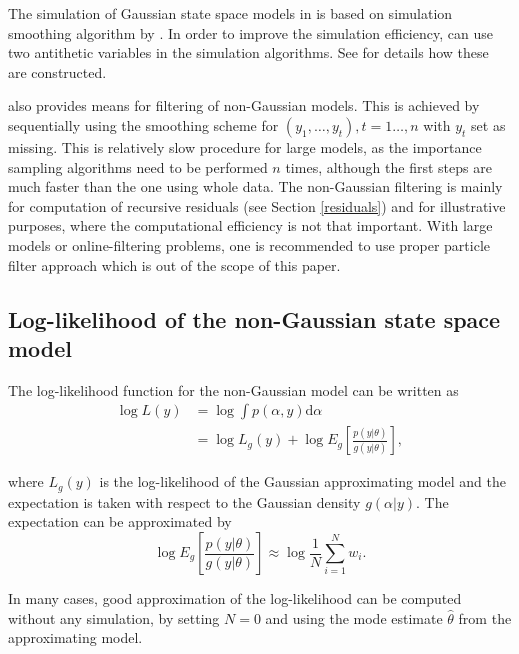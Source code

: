 \documentclass[nojss,article]{jss}\usepackage[]{graphicx}\usepackage[]{color}
\begin{document}
The simulation of Gaussian state space models in  is based on simulation smoothing algorithm by \citet{DK2002}. In order to improve the simulation efficiency,  can use two antithetic variables in the simulation algorithms. See \citet[p.~265-266]{DK2012} for details how these are constructed.

 also provides means for filtering of non-Gaussian models. This is achieved by sequentially using the smoothing scheme for $(y_1,\ldots,y_t), t=1\ldots,n$ with $y_t$ set as missing. This is relatively slow procedure for large models, as the importance sampling algorithms need to be performed $n$ times, although the first steps are much faster than the one using whole data. The non-Gaussian filtering is mainly for computation of recursive residuals (see Section \ref{residuals}) and for illustrative purposes, where the computational efficiency is not that important. With large models or online-filtering problems, one is recommended to use proper particle filter approach which is out of the scope of this paper. 

\subsection{Log-likelihood of the non-Gaussian state space model}\label{ngloglik}

The log-likelihood function for the non-Gaussian model can be written as \citep[p.~272]{DK2012}
\begin{equation*}
\begin{aligned}
\log L(y) &= \log \int p(\alpha,y)\textrm{d}\alpha \\
          &= \log L_g(y)+ \log E_g\left[\frac{p(y|\theta)}{g(y|\theta)}\right],
\end{aligned}
\end{equation*}

where $L_g(y)$ is the log-likelihood of the Gaussian approximating model and the expectation is taken with respect to the Gaussian density $g(\alpha|y)$. The expectation can be approximated by
\begin{equation}\label{eg}
\log E_g\left[\frac{p(y|\theta)}{g(y|\theta)}\right] \approx \log\frac{1}{N}\sum_{i=1}^N w_i.
\end{equation}

In many cases, good approximation of the log-likelihood can be computed without any simulation, by setting $N=0$ and using the mode estimate $\hat \theta$ from the approximating model. 
\end{document}
